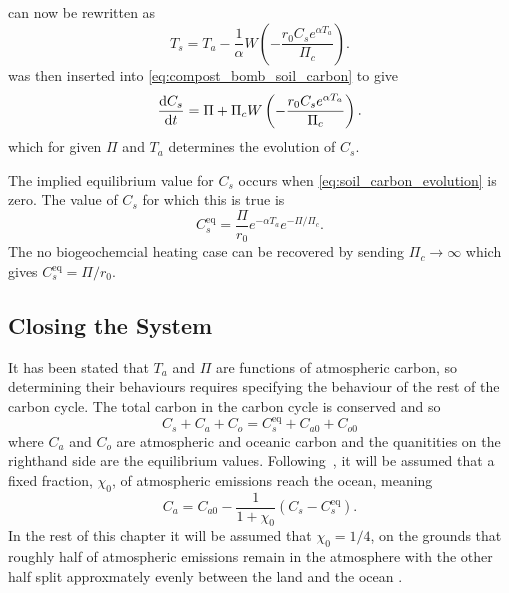  can now be rewritten as
\begin{equation}
  \label{eq:soil_temperature_equilibrium_nppc}
  T_s = T_a - \frac{1}{\alpha} W\left(-\frac{r_0C_s e^{\alpha T_a}}{\Pi_c} \right).
\end{equation}
 was then inserted into \cref{eq:compost_bomb_soil_carbon} to give
\begin{equation}
  \label{eq:soil_carbon_evolution}
  \dv{C_s}{t} = \Pi + \Pi_c W\left(-\frac{r_0C_s e^{\alpha T_a}}{\Pi_c} \right).
\end{equation}
which for given $\Pi$ and $T_a$ determines the evolution of $C_s$.

The implied equilibrium value for $C_s$ occurs when \cref{eq:soil_carbon_evolution} is zero. The value of $C_s$ for which this is true is
\begin{equation}
  \label{eq:equilibrium_soil_carbon}
  C_s^{\mathrm{eq}} = \frac{\Pi}{r_0} e^{-\alpha T_a} e^{-\Pi/\Pi_c}.
\end{equation}
The no biogeochemcial heating case can be recovered by sending $\Pi_c \rightarrow \infty$ which gives $C_s^{\mathrm{eq}} = \Pi/r_0$.

\subsection{Closing the System}
It has been stated that $T_a$ and $\Pi$ are functions of atmospheric carbon, so determining their behaviours requires specifying the behaviour of the rest of the carbon
cycle. The total carbon in the carbon cycle is conserved and so
\begin{equation}
  \label{eq:carbon_conservation}
  C_s + C_a + C_o = C_s^{\mathrm{eq}} + C_{a0} + C_{o0}
\end{equation}
where $C_a$ and $C_o$ are atmospheric and oceanic carbon and the quanitities on the righthand side are the equilibrium values.
Following~\cite{Cox2006}, it will be assumed that a fixed fraction, $\chi_0$, of atmospheric emissions reach the ocean, meaning
\begin{equation}
  \label{eq:simple_ocean}
  C_a = C_{a0} -\frac{1}{1+\chi_0} (C_s - C_{s}^{\mathrm{eq}}).
\end{equation}
In the rest of this chapter it will be assumed that $\chi_0 = 1/4$, on the grounds that roughly half of atmospheric emissions remain in the atmosphere \parencite{Jones2005}
with the other half split approxmately evenly between the land and the ocean \parencite{Friedlingstein2022}.


